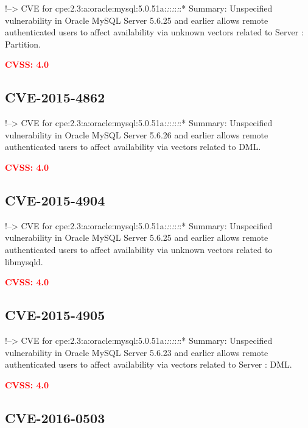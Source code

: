 \documentclass[a4paper, 12pt]{article}
\begin{document}
!--\textgreater{} CVE for
cpe:2.3:a:oracle:mysql:5.0.51a:\emph{:}:\emph{:}:\emph{:}:* Summary:
Unspecified vulnerability in Oracle MySQL Server 5.6.25 and earlier
allows remote authenticated users to affect availability via unknown
vectors related to Server : Partition.

\textbf{\textcolor{red}{CVSS: 4.0}}

\hypertarget{cve-2015-4862}{%
\subsection{CVE-2015-4862}\label{cve-2015-4862}}

!--\textgreater{} CVE for
cpe:2.3:a:oracle:mysql:5.0.51a:\emph{:}:\emph{:}:\emph{:}:* Summary:
Unspecified vulnerability in Oracle MySQL Server 5.6.26 and earlier
allows remote authenticated users to affect availability via vectors
related to DML.

\textbf{\textcolor{red}{CVSS: 4.0}}

\hypertarget{cve-2015-4904}{%
\subsection{CVE-2015-4904}\label{cve-2015-4904}}

!--\textgreater{} CVE for
cpe:2.3:a:oracle:mysql:5.0.51a:\emph{:}:\emph{:}:\emph{:}:* Summary:
Unspecified vulnerability in Oracle MySQL Server 5.6.25 and earlier
allows remote authenticated users to affect availability via unknown
vectors related to libmysqld.

\textbf{\textcolor{red}{CVSS: 4.0}}

\hypertarget{cve-2015-4905}{%
\subsection{CVE-2015-4905}\label{cve-2015-4905}}

!--\textgreater{} CVE for
cpe:2.3:a:oracle:mysql:5.0.51a:\emph{:}:\emph{:}:\emph{:}:* Summary:
Unspecified vulnerability in Oracle MySQL Server 5.6.23 and earlier
allows remote authenticated users to affect availability via vectors
related to Server : DML.

\textbf{\textcolor{red}{CVSS: 4.0}}

\hypertarget{cve-2016-0503}{%
\subsection{CVE-2016-0503}\label{cve-2016-0503}}
\end{document}

